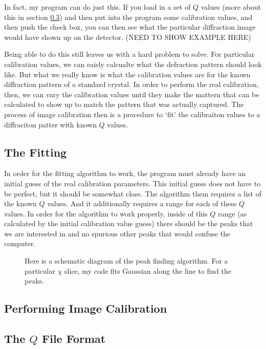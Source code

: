 In fact, my program can do just this. If you load in 
a set of $Q$ values (more about this in section 
\ref{TheQValues})
and then put into the program some calibration values,
and then push the  check box, 
you can then see what the particular diffraction
image would have shown up on the detector. 
(NEED TO SHOW EXAMPLE HERE)

Being able to do this still leaves us with a hard 
problem to solve. For particular calibration values,
we can eaisly calcualte what the defraction pattern 
should look like. But what we really know is what
the calibration values are for the known diffraction
pattern of a standard crystal. In order to perform the
real calibration, then, we can vary the calibration 
values until they make the mattern that can be calculated
to show up to match the pattern that was actually 
captured. The process of image calibration then is a 
procedure to `fit' the calibraiton values to a
diffraciton patter with known $Q$ values.

\subsection{The Fitting} 

In order for the fitting algorithm to work, the program must already have an initial guess of the real calibration parameters. This initial guess does not have to be perfect, but it should be somewhat close. The algorithm them requires a list of the known $Q$ values. And it additionally requires a range for each of these $Q$ values. In order for the algorithm to work properly, inside of this $Q$ range (as calculated by the initial calibration value guess) there should be the peaks that we are interested in and no spurious other peaks that would confuse the computer.




\begin{SCfigure}
\centering

\caption{Here is a schematic diagram of the peak finding 
algorithm. For a particular $\chi$ slice, my code fits 
Gaussian along the line to find the peaks.}
\label{Fitting}
\end{SCfigure}


\subsection{Performing Image Calibration}

\subsection{The $Q$ File Format}\label{TheQValues}

